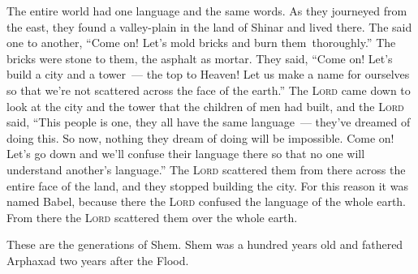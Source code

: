 
\begin{inparaenum}
     The entire world had one language and the same words.%
     As they journeyed from the east, they found a valley-plain in the land of Shinar and lived there.%
     The said one to another, ``Come on! Let's mold bricks and burn them\understood\ thoroughly.'' The bricks were stone to them, the asphalt as mortar.%
     They said, ``Come on! Let's build a city and a tower~--- the top to Heaven! Let us make a name for ourselves so that we're not scattered across the face of the earth.''%
     The \textsc{Lord} came down to look at the city and the tower that the children of men had built,%
     and the \textsc{Lord} said, ``This people is one, they all have the same language~--- they've dreamed of doing this. So now, nothing they dream of doing will be impossible.%
     Come on! Let's go down and we'll confuse their language there so that no one will understand another's language.''%
     The \textsc{Lord} scattered them from there across the entire face of the land, and they stopped building the city.%
     For this reason it was named Babel, because there the \textsc{Lord} confused the language of the whole earth. From there the \textsc{Lord} scattered them over the whole earth.%
    
     These are the generations of Shem. Shem was a hundred years old and fathered Arphaxad two years after the Flood.%
    
    
    
    
    
    
    
    
    
\end{inparaenum}
